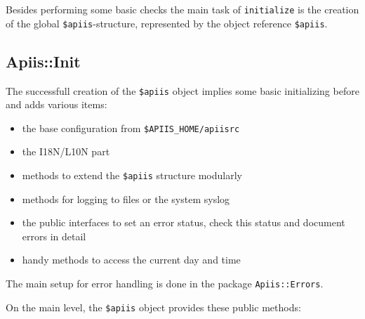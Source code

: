 Besides performing some basic checks the main task of
\verb+initialize+ is the creation of the global
\verb+$apiis+-structure, represented by the object reference \verb+$apiis+.

\subsection{Apiis::Init}
The successfull creation of the \verb+$apiis+ object implies some basic
initializing before and adds various items:
\begin{itemize}
   \item the base configuration from \verb+$APIIS_HOME/apiisrc+
   \item the I18N/L10N part
   \item methods to extend the \verb+$apiis+ structure modularly
   \item methods for logging to files or the system syslog
   \item the public interfaces to set an error status, check this status and
   document errors in detail
   \item handy methods to access the current day and time 
\end{itemize}

The main setup for error handling is done in the package \verb+Apiis::Errors+.

On the main level, the \verb+$apiis+ object provides these public
methods:

